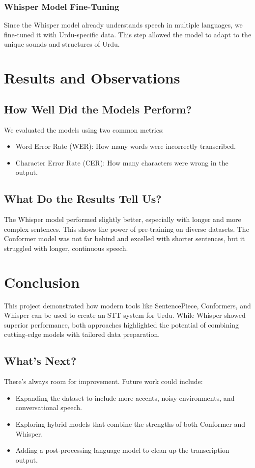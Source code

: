 \documentclass[12pt,a4paper]{report}
\begin{document}
\subsection{Whisper Model Fine-Tuning}
Since the Whisper model already understands speech in multiple languages, we fine-tuned it with Urdu-specific data. This step allowed the model to adapt to the unique sounds and structures of Urdu.

\chapter{Results and Observations}
\section{How Well Did the Models Perform?}
We evaluated the models using two common metrics:
\begin{itemize}
    \item Word Error Rate (WER): How many words were incorrectly transcribed.
    \item Character Error Rate (CER): How many characters were wrong in the output.
\end{itemize}


\section{What Do the Results Tell Us?}
The Whisper model performed slightly better, especially with longer and more complex sentences. This shows the power of pre-training on diverse datasets. The Conformer model was not far behind and excelled with shorter sentences, but it struggled with longer, continuous speech.

\chapter{Conclusion}
This project demonstrated how modern tools like SentencePiece, Conformers, and Whisper can be used to create an STT system for Urdu. While Whisper showed superior performance, both approaches highlighted the potential of combining cutting-edge models with tailored data preparation.

\section{What’s Next?}
There’s always room for improvement. Future work could include:
\begin{itemize}
    \item Expanding the dataset to include more accents, noisy environments, and conversational speech.
    \item Exploring hybrid models that combine the strengths of both Conformer and Whisper.
    \item Adding a post-processing language model to clean up the transcription output.
\end{itemize}
\end{document}
